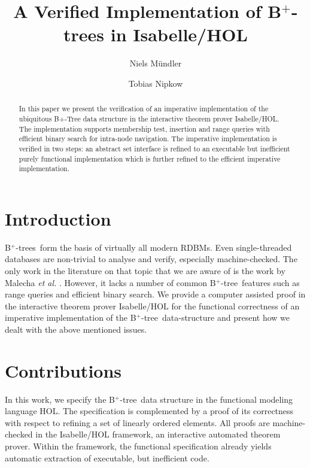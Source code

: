\documentclass[a4paper,UKenglish,cleveref, autoref, thm-restate]{lipics-v2021}
\title{A Verified Implementation of B$^+$-trees in Isabelle/HOL}
\author{Niels Mündler}{Department of Computer Science, ETH Zurich, Switzerland}{nmuendler@ethz.ch}{https://orcid.org/0000-0003-3851-2557}{}%
\author{Tobias Nipkow}{Department of Informatics, Technical University of Munich, Germany}{nipkow@in.tum.de}{https://orcid.org/0000-0003-0730-515X}{}
\newcommand{\btree}{B$^+$-tree}
\newcommand{\btrees}{B$^+$-trees}
\begin{document}
\maketitle

\begin{abstract}
    In this paper we present the verification of an imperative
    implementation of the ubiquitous B+-Tree data structure in the
    interactive theorem prover Isabelle/HOL. The implementation supports
    membership test, insertion and range queries with efficient binary
    search for intra-node navigation. The imperative implementation is
    verified in two steps: an abstract set interface is refined to an
    executable but inefficient purely functional implementation which is further
    refined to the efficient imperative implementation.
\end{abstract}

\section{Introduction}
\label{sec:introduction}

\btrees\ form the basis of virtually all modern RDBMs.
Even single-threaded databases are non-trivial to analyse and verify,
especially machine-checked.
The only work in the literature on that topic that we are aware of
is the work by Malecha \emph{et al.} \cite{DBLP:conf/popl/MalechaMSW10}.
However, it lacks a number of common \btree\ features such as range
queries and efficient binary search.
We provide a computer assisted proof in the interactive
theorem prover Isabelle/HOL \cite{DBLP:books/sp/NipkowK14} for the functional
correctness of an imperative implementation of the \btree\ data-structure
and present how we dealt with the above mentioned issues.



\section{Contributions}

In this work, we specify the \btree\ data structure in the
functional modeling language HOL.
The specification is complemented by a proof of its correctness
with respect to refining a set of linearly ordered elements.
All proofs are machine-checked in the Isabelle/HOL framework,
an interactive automated theorem prover.
Within the framework,
the functional specification already yields automatic extraction of executable,
but inefficient code.
\end{document}
